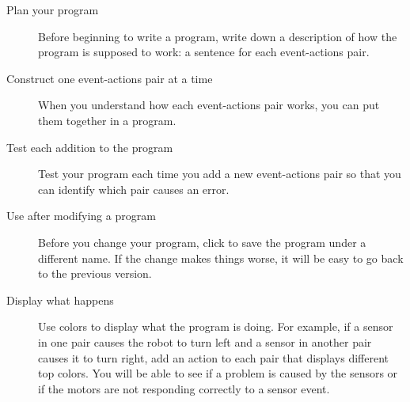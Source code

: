 \begin{description}

\item[Plan your program] Before beginning to write a program, write down
a description of how the program is supposed to work: a sentence for
each event-actions pair.

\item[Construct one event-actions pair at a time] When you understand
how each event-actions pair works, you can put them together in a
program.

\item[Test each addition to the program] Test your program each time you
add a new event-actions pair so that you can identify which pair causes
an error.

\item[Use  after modifying a program] Before you change your
program, click  to save the program under a different name.
If the change makes things worse, it will be easy to go back to the
previous version.

\item[Display what happens] Use colors to display what the program is
doing. For example, if a sensor in one pair causes the robot to turn
left and a sensor in another pair causes it to turn right, add an action
to each pair that displays different top colors. You will be able to see
if a problem is caused by the sensors or if the motors are not
responding correctly to a sensor event.

\end{description}



